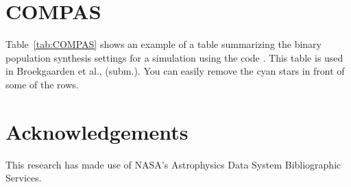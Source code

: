 \documentclass[fleqn,usenatbib, onecolumn]{mnras}
\begin{document}
\section{COMPAS}
Table~\ref{tab:COMPAS} shows an example of a table summarizing the binary population synthesis settings for a simulation using the code {}. This table is used in Broekgaarden et al., (subm.). You can easily remove the cyan stars in front of some of the rows. 



\section*{Acknowledgements}
This research has made use of NASA’s Astrophysics Data System Bibliographic Services.


\vspace{10cm}
\end{document}
